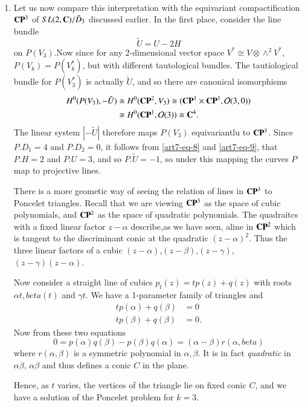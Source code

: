 \medskip
\begin{example*}
~

\begin{enumerate}[]
 \item Let us now compare this interpretation with the equivariant compactification $\mathbf{C}\mathbf{P}^{3}$ of $SL(2, \mathbf{C})/\tilde{D}_{3}$ discussed earlier. In the first place, consider the line bundle
    $$
    \tilde{U}= U-2H
    $$
    on $P(V_{3})$.Now since for any 2-dimensional vector space $V^{*}\cong V \otimes \wedge^{2}V^{*}$, $P(V_{k})=P(V_{k}^{*})$, but with different tautological bundles. The tautiological bundle for $P(V_{3}^{*})$ is actually $\tilde{U}$, and so there are canonical isomorphisms
    \begin{align*}
    H^{0}(P(V_{3}), -\tilde{U}) &\cong H^{0}(\mathbf{C}\mathbf{P}^{2}, V_{3})\cong (\mathbf{C}\mathbf{P}^{1} \times \mathbf{C}\mathbf{P}^{1}, \mathcal{O}(3, 0))\\
       &\cong H^{0}(\mathbf{C}\mathbf{P}^{1}, \mathcal{O}(3))\cong \mathbf{C}^{4}.
    \end{align*}
    The linear system $|-\tilde{U}|$ therefore maps $P(V_{3})$ equivariantlu to $\mathbf{C}\mathbf{P}^{3}$. Since $P.D_{1} = 4$ and $P.D_{2} = 0$, it follows from \eqref{art7-eq-8} and \eqref{art7-eq-9}, that $P.H = 2$ and $P.U = 3$, and so $P.\tilde{U} = -1$, so under this mapping the curves $P$ map to projective lines.

    There is a more geometic way of seeing the relation of lines in $\mathbf{C}\mathbf{P}^{3}$ to Poncelet triangles. Recall that we are viewing  $\mathbf{C}\mathbf{P}^{3}$ as the space of cubic polynomials, and $\mathbf{C}\mathbf{P}^{2}$ as the space of quadratic polynomials. The quadraitcs with a fixed linear factor $z-\alpha$ describe,\pageoriginale as we have seen, aline in $\mathbf{C}\mathbf{P}^{2}$ which is tangent to the discriminant conic at the quadratic $(z-\alpha)^{2}$. Thus the three linear factors of a cubic $(z-\alpha)$,$(z-\beta)$,$(z-\gamma)$, $(z-\gamma) (z-\alpha)$.

    Now consider a straight line of cubics $p_{t}(z)=tp(z)+q(z)$ with roots $\alpha{t}, beta(t)$ and $\gamma{t}$. We have a 1-parameter family of triangles and
    \begin{align*}
    tp(\alpha) + q(\beta) &= 0\\
    tp(\beta) +q(\beta) &=0.
    \end{align*}
    Now from these two equations
    $$
    0 = p(\alpha)q(\beta) -p(\beta)q(\alpha)= (\alpha-\beta)r(\alpha, beta)
    $$
    where $r(\alpha, \beta)$ is a symmetric polynomial in $\alpha,\beta$. It is in fact \textit{quadratic} in $\alpha  \beta$, $\alpha \beta$ and thus defines a conic $C$ in the plane.

    Hence, as $t$ varies, the vertices of the triangle lie on fixed conic $C$, and we have a solution of the Poncelet problem for $k=3$.
    \end{enumerate}
\end{example*}


